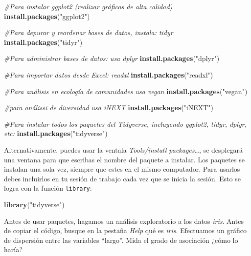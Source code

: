 \documentclass[
]{article}
\newenvironment{Shaded}{\begin{snugshade}}{\end{snugshade}}
\newcommand{\CommentTok}[1]{\textcolor[rgb]{0.56,0.35,0.01}{\textit{#1}}}
\newcommand{\KeywordTok}[1]{\textcolor[rgb]{0.13,0.29,0.53}{\textbf{#1}}}
\newcommand{\NormalTok}[1]{#1}
\newcommand{\OperatorTok}[1]{\textcolor[rgb]{0.81,0.36,0.00}{\textbf{#1}}}
\newcommand{\StringTok}[1]{\textcolor[rgb]{0.31,0.60,0.02}{#1}}
\begin{document}
\begin{Shaded}
\begin{Highlighting}[]
\CommentTok{#Para instalar ggplot2 (realizar gráficos de alta calidad)}
\KeywordTok{install.packages}\NormalTok{(}\StringTok{"ggplot2"}\NormalTok{)}

\CommentTok{#Para depurar y reordenar bases de datos, instala: tidyr}
\KeywordTok{install.packages}\NormalTok{(}\StringTok{"tidyr"}\NormalTok{)}

\CommentTok{#Para administrar bases de datos: usa dplyr}
\KeywordTok{install.packages}\NormalTok{(}\StringTok{"dplyr"}\NormalTok{)}

\CommentTok{#Para importar datos desde Excel: readxl}
\KeywordTok{install.packages}\NormalTok{(}\StringTok{"readxl"}\NormalTok{)}

\CommentTok{#Para análisis en ecología de comunidades usa vegan}
\KeywordTok{install.packages}\NormalTok{(}\StringTok{"vegan"}\NormalTok{)}

\CommentTok{#para análissi de diversidad usa iNEXT}
\KeywordTok{install.packages}\NormalTok{(}\StringTok{"iNEXT"}\NormalTok{)}

\CommentTok{#Para instalar todos los paquetes del Tidyverse, incluyendo ggplot2, tidyr, dplyr, etc:}
\KeywordTok{install.packages}\NormalTok{(}\StringTok{"tidyverse"}\NormalTok{)}
\end{Highlighting}
\end{Shaded}

Alternativamente, puedes usar la ventala \emph{Tools/install
packages\ldots{}}, se desplegará una ventana para que escribas el nombre
del paquete a instalar. Los paquetes se instalan una sola vez, siempre
que estes en el mismo computador. Para usarlos debes incluirlos en tu
sesión de trabajo cada vez que se inicia la sesión. Esto se logra con la
función \texttt{library}:

\begin{Shaded}
\begin{Highlighting}[]
\KeywordTok{library}\NormalTok{(}\StringTok{"tidyverse"}\NormalTok{)}
\end{Highlighting}
\end{Shaded}

Antes de usar paquetes, hagamos un análisis exploratorio a los datos
\emph{iris}. Antes de copiar el código, busque en la pestaña \emph{Help}
qué es \emph{iris}. Efectuamos un gráfico de dispersión entre las
variables ``largo''. Mida el grado de asociación ¿cómo lo haría?

\begin{Shaded}
\end{Shaded}
\end{document}
